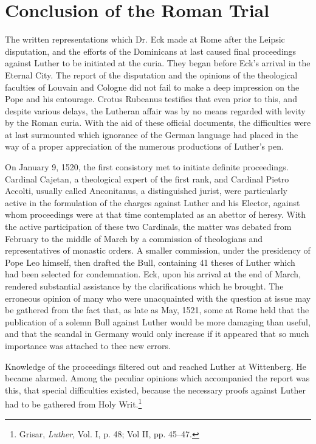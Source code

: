 \section{Conclusion of the Roman Trial}

The written representations which Dr. Eck made at Rome after the
Leipsic disputation, and the efforts of the Dominicans at last caused
final proceedings against Luther to be initiated at the curia. They
began before Eck’s arrival in the Eternal City. The report of the disputation
and the opinions of the theological faculties of Louvain and
Cologne did not fail to make a deep impression on the Pope and his
entourage. Crotus Rubeanus testifies that even prior to this, and despite
various delays, the Lutheran affair was by no means regarded
with levity by the Roman curia. With the aid of these official documents,
the difficulties were at last surmounted which ignorance of
the German language had placed in the way of a proper appreciation
of the numerous productions of Luther’s pen.

On January 9, 1520, the first consistory met to initiate definite
proceedings. Cardinal Cajetan, a theological expert of the first rank,
and Cardinal Pietro Accolti, usually called Anconitanus, a distinguished
jurist, were particularly active in the formulation of the
charges against Luther and his Elector, against whom proceedings
were at that time contemplated as an abettor of heresy. With the
active participation of these two Cardinals, the matter was debated
from February to the middle of March by a commission of theologians
and representatives of monastic orders. A smaller commission, under
the presidency of Pope Leo himself, then drafted the Bull, containing
41 theses of Luther which had been selected for condemnation. Eck,
upon his arrival at the end of March, rendered substantial assistance
by the clarifications which he brought. The erroneous opinion of
many who were unacquainted with the question at issue may be
gathered from the fact that, as late as May, 1521, some at Rome held
that the publication of a solemn Bull against Luther would be more
damaging than useful, and that the scandal in Germany would only
increase if it appeared that so much importance was attached to thee
new errors.

Knowledge of the proceedings filtered out and reached Luther at
Wittenberg. He became alarmed. Among the peculiar opinions which
accompanied the report was this, that special difficulties existed, because
the necessary proofs against Luther had to be gathered from
Holy Writ.\footnote{Grisar, \textit{Luther}, Vol. I, p. 48; Vol II, pp. 45--47.}

